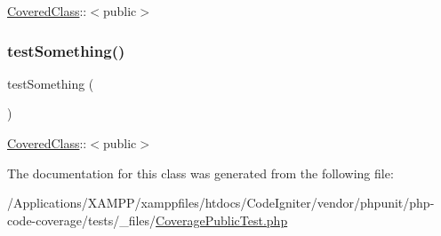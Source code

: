 \mbox{\hyperlink{class_covered_class}{Covered\+Class}}\+:\+:$<$public$>$ \mbox{\label{class_coverage_public_test_a0fc4e17369bc9607ebdd850d9eda8167}} 
\subsubsection{\texorpdfstring{test\+Something()}{testSomething()}\hspace{0.1cm}{\footnotesize\ttfamily [2/2]}}
{\footnotesize\ttfamily test\+Something (\begin{DoxyParamCaption}{ }\end{DoxyParamCaption})}

\mbox{\hyperlink{class_covered_class}{Covered\+Class}}\+:\+:$<$public$>$ 

The documentation for this class was generated from the following file\+:\begin{DoxyCompactItemize}
\item 
/\+Applications/\+X\+A\+M\+P\+P/xamppfiles/htdocs/\+Code\+Igniter/vendor/phpunit/php-\/code-\/coverage/tests/\+\_\+files/\mbox{\hyperlink{php-code-coverage_2tests_2__files_2_coverage_public_test_8php}{Coverage\+Public\+Test.\+php}}\end{DoxyCompactItemize}
